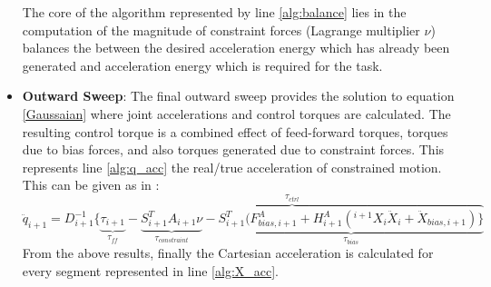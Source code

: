 \begin{itemize}
The core of the algorithm represented by line \ref{alg:balance} lies in the computation of the magnitude of constraint forces (Lagrange multiplier $\nu$) balances the between the desired acceleration energy which has already been generated and acceleration energy which is required for the task.

\item \textbf{Outward Sweep}: The final outward sweep provides the solution to equation \ref{Gaussaian} where joint accelerations and control torques are calculated. The resulting control torque is a combined effect of feed-forward torques, torques due to bias forces, and also torques generated due to constraint forces. This represents line \ref{alg:q_acc} the real/true acceleration of constrained motion. This can be given as in \cite{vereshchagin1989modeling}:
	\begin{equation}
			{\ddot{q}_{i+1} = D^{-1}_{i+1}\{\overbrace{\underbrace{\tau_{i+1}}_{\tau_{ff}} - \underbrace{S^T_{i+1}A_{i+1}\nu}_{\tau_{constraint}} -\underbrace{S^T_{i+1} (F_{bias,i+1}^A + H_{i+1}^A ({^{i+1}X_{i}} \ddot{X}_i + \ddot{X}_{bias,i+1})\}}_{\tau_{bias}}}^{\tau_{ctrl}}}\label{outwardsweep2}
	\end{equation}
From the above results, finally the Cartesian acceleration is calculated for every segment represented in line \ref{alg:X_acc}.



\end{itemize}
